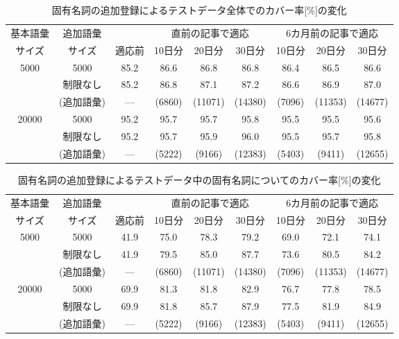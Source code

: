 \begin{table}[htbp]
 \caption{固有名詞の追加登録によるテストデータ全体でのカバー率[\%]の変化}\label{tbl:Cover1}
\begin{center}
\vspace*{1ex}
\begin{tabular}{|c|c|c|c|c|c|c|c|c|}
\hline
基本語彙 & 追加語彙 & &
 \multicolumn{3}{c|}{直前の記事で適応} &
 \multicolumn{3}{c|}{6カ月前の記事で適応} \\
\cline{4-9}
サイズ & サイズ &
 適応前 & 10日分 & 20日分 & 30日分 & 10日分 & 20日分 & 30日分 \\
\hline
 5000 & 5000     & 85.2 & 86.6 & 86.8 & 86.8 & 86.4 & 86.5 & 86.6 \\
\cline{2-9}
      & 制限なし & 85.2 & 86.8 & 87.1 & 87.2 & 86.6 & 86.9 & 87.0 \\
      &(追加語彙)&  ---  & (6860)&(11071)&(14380)&(7096) &(11353)&(14677)\\
\hline
 20000& 5000     & 95.2 & 95.7 & 95.7 & 95.8 & 95.5 & 95.5 & 95.6 \\
\cline{2-9}
      & 制限なし & 95.2 & 95.7 & 95.9 & 96.0 & 95.5 & 95.7 & 95.8 \\
      &(追加語彙)&  ---  & (5222)&(9166) &(12383)&(5403) &(9411) &(12655)\\
\hline
\end{tabular}
\end{center}
\end{table}

\begin{table}[htbp]
 \caption{固有名詞の追加登録によるテストデータ中の固有名詞についてのカバー率[\%]の変化}\label{tbl:Cover2}
\begin{center}
\vspace*{1ex}
\begin{tabular}{|c|c|c|c|c|c|c|c|c|}
\hline
基本語彙 & 追加語彙 & &
 \multicolumn{3}{c|}{直前の記事で適応} &
 \multicolumn{3}{c|}{6カ月前の記事で適応} \\
\cline{4-9}
サイズ & サイズ &
 適応前 & 10日分 & 20日分 & 30日分 & 10日分 & 20日分 & 30日分 \\
\hline
 5000 & 5000     & 41.9 & 75.0 & 78.3 & 79.2 & 69.0 & 72.1 & 74.1 \\
\cline{2-9}
      & 制限なし & 41.9 & 79.5 & 85.0 & 87.7 & 73.6 & 80.5 & 84.2 \\
      &(追加語彙)&  ---  & (6860)&(11071)&(14380)&(7096) &(11353)&(14677)\\
\hline
 20000& 5000     & 69.9 & 81.3 & 81.8 & 82.9 & 76.7 & 77.8 & 78.5 \\
\cline{2-9}
      & 制限なし & 69.9 & 81.8 & 85.7 & 87.9 & 77.5 & 81.9 & 84.9 \\
      &(追加語彙)&  ---  & (5222)&(9166) &(12383)&(5403) &(9411) &(12655)\\
\hline
\end{tabular}
\end{center}
\end{table}


